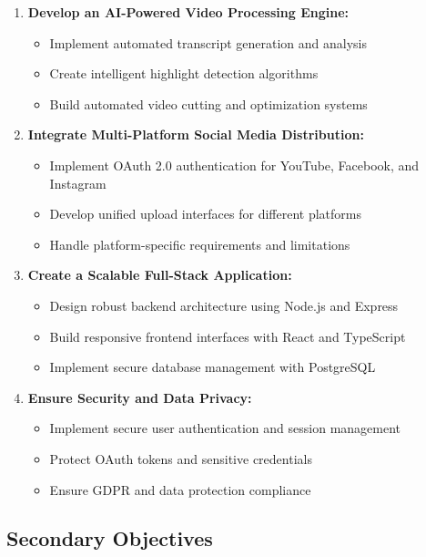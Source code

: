 \begin{enumerate}
    \item \textbf{Develop an AI-Powered Video Processing Engine:}
    \begin{itemize}
        \item Implement automated transcript generation and analysis
        \item Create intelligent highlight detection algorithms
        \item Build automated video cutting and optimization systems
    \end{itemize}
    
    \item \textbf{Integrate Multi-Platform Social Media Distribution:}
    \begin{itemize}
        \item Implement OAuth 2.0 authentication for YouTube, Facebook, and Instagram
        \item Develop unified upload interfaces for different platforms
        \item Handle platform-specific requirements and limitations
    \end{itemize}
    
    \item \textbf{Create a Scalable Full-Stack Application:}
    \begin{itemize}
        \item Design robust backend architecture using Node.js and Express
        \item Build responsive frontend interfaces with React and TypeScript
        \item Implement secure database management with PostgreSQL
    \end{itemize}
    
    \item \textbf{Ensure Security and Data Privacy:}
    \begin{itemize}
        \item Implement secure user authentication and session management
        \item Protect OAuth tokens and sensitive credentials
        \item Ensure GDPR and data protection compliance
    \end{itemize}
\end{enumerate}

\subsection{Secondary Objectives}

